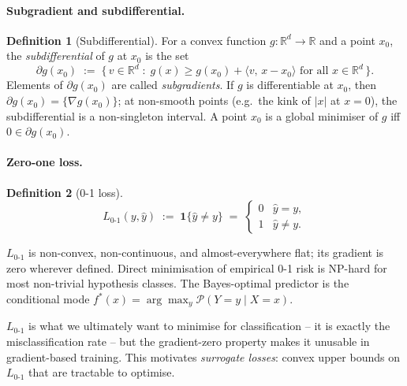 \documentclass[11pt]{article}
\theoremstyle{definition}
\newtheorem{definition}{Definition}
\begin{document}
\paragraph{Subgradient and subdifferential.}

\begin{definition}[Subdifferential]
For a convex function $g : \mathbb{R}^{d} \to \mathbb{R}$ and a point $x_{0}$,
the \emph{subdifferential} of $g$ at $x_{0}$ is the set
\[
  \partial g(x_{0}) \;:=\; \bigl\{\, v \in \mathbb{R}^{d} \;:\;
    g(x) \geq g(x_{0}) + \langle v,\, x - x_{0}\rangle
    \text{ for all } x \in \mathbb{R}^{d} \,\bigr\}.
\]
Elements of $\partial g(x_{0})$ are called \emph{subgradients}. If $g$ is
differentiable at $x_{0}$, then $\partial g(x_{0}) = \{\nabla g(x_{0})\}$;
at non-smooth points (e.g.\ the kink of $|x|$ at $x = 0$), the
subdifferential is a non-singleton interval. A point $x_{0}$ is a global
minimiser of $g$ iff $0 \in \partial g(x_{0})$.
\end{definition}

\paragraph{Zero-one loss.}

\begin{definition}[0-1 loss]
\[
  L_{0\text{-}1}(y, \hat y) \;:=\; \mathbf{1}\{\hat y \neq y\}
  \;=\; \begin{cases} 0 & \hat y = y, \\ 1 & \hat y \neq y. \end{cases}
\]
\end{definition}

\begin{mathnote}
$L_{0\text{-}1}$ is non-convex, non-continuous, and almost-everywhere flat;
its gradient is zero wherever defined. Direct minimisation of empirical 0-1
risk is NP-hard for most non-trivial hypothesis classes. The Bayes-optimal
predictor is the conditional mode $f^{\ast}(x) = \arg\max_{y}
\mathcal{P}(Y = y \mid X = x)$.
\end{mathnote}

\begin{mlnote}
$L_{0\text{-}1}$ is what we ultimately want to minimise for classification --
it is exactly the misclassification rate -- but the gradient-zero property
makes it unusable in gradient-based training. This motivates
\emph{surrogate losses}: convex upper bounds on $L_{0\text{-}1}$ that are
tractable to optimise.
\end{mlnote}
\end{document}
